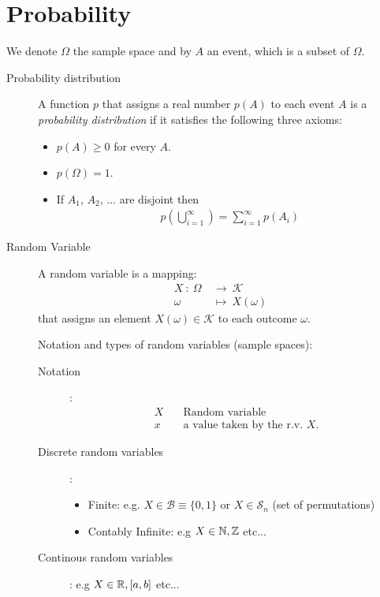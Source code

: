 \section{Probability}
We denote $\Omega$ the sample space and by $A$ an event, which is a subset of $\Omega$.
\begin{description}
\item[Probability distribution] A function $p$ that assigns a real number $p(A)$ to each event $A$ is a \emph{probability distribution} if it satisfies the following three axioms:
    \begin{itemize}
    \item $p(A) \geq 0$ for every $A$.
    \item $p(\Omega) = 1$.
    \item If $A_1$, $A_2$, $\ldots$ are disjoint then
        \begin{align*}
            p\left( \bigcup_{i=1}^\infty \right) = \sum_{i=1}^\infty p(A_i)
        \end{align*}
    \end{itemize}
\item[Random Variable] A random variable is a mapping:
    \begin{align*}
        X\ :\ \Omega\ &\rightarrow \ \mathcal K\\
        \omega\ &\mapsto \ X(\omega)
    \end{align*}
    that assigns an element $X(\omega) \in \mathcal K$ to each outcome $\omega$.
    
    Notation and types of random variables (sample spaces):
    \begin{description}
        \item[Notation]:
            \begin{align*}
                X &\quad \text{Random variable}\\
                x &\quad \text{a value taken by the r.v. $X$.}
            \end{align*}
        \item[Discrete random variables]:
            \begin{itemize}
                \item Finite: e.g. $X\in \mathcal B \equiv \{0,1\}$ or $X\in \mathcal S_n$ (set of permutations)
                \item Contably Infinite: e.g $X\in \mathbb{N},\mathbb{Z}$ etc...
            \end{itemize}
        \item[Continous random variables]: e.g $X\in \mathbb{R}, [a,b]$ etc...

    \end{description}
\end{description}

